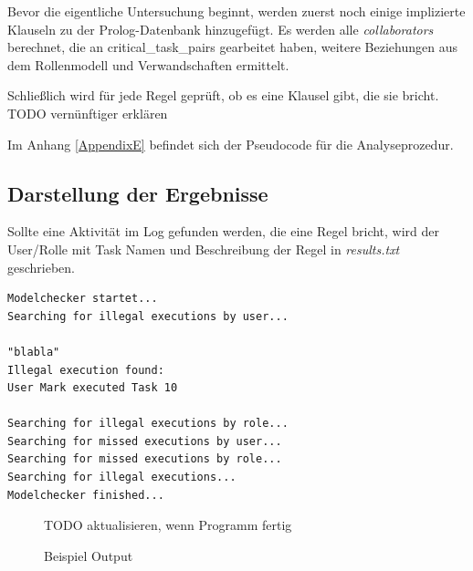 Bevor die eigentliche Untersuchung beginnt, werden zuerst noch einige implizierte Klauseln zu der Prolog-Datenbank hinzugefügt. Es werden alle \textit{collaborators} berechnet, die an {critical\_task\_pairs} gearbeitet haben, weitere Beziehungen aus dem Rollenmodell und Verwandschaften ermittelt.

Schließlich wird für jede Regel geprüft, ob es eine Klausel gibt, die sie bricht.\\
\color{red} TODO vernünftiger erklären
\color{black}

Im Anhang \ref{AppendixE} befindet sich der Pseudocode für die Analyseprozedur.

%
%
\subsection{Darstellung der Ergebnisse}
\label{sec:results}
Sollte eine Aktivität im Log gefunden werden, die eine Regel bricht, wird der User/Rolle mit Task Namen und Beschreibung der Regel in \textit{results.txt} geschrieben.

\begin{verbatim}
Modelchecker startet...
Searching for illegal executions by user...

"blabla"
Illegal execution found: 
User Mark executed Task 10

Searching for illegal executions by role...
Searching for missed executions by user...
Searching for missed executions by role...
Searching for illegal executions...
Modelchecker finished...
\end{verbatim}
\begin{figure}[!h]
\small \color{red} TODO aktualisieren, wenn Programm fertig
\caption{Beispiel Output}
\label{fig:sampleoutput}
\end{figure}

